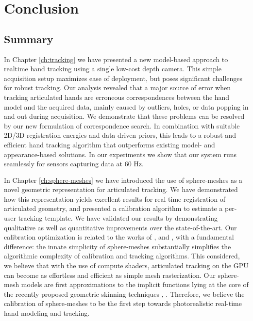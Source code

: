 \chapter{Conclusion}

\section{Summary}

In Chapter \ref{ch:tracking} we have presented a new model-based approach to realtime hand tracking using a single low-cost depth camera. This simple acquisition setup maximizes ease of deployment, but poses significant challenges for robust tracking. 
Our analysis revealed that a major source of error when tracking articulated hands are erroneous correspondences between the hand model and the acquired data, mainly caused by outliers, holes, or data popping in and out during acquisition. 
We demonstrate that these problems can be resolved by our new formulation of correspondence search. In combination with suitable 2D/3D registration energies and data-driven priors, this leads to a robust and efficient hand tracking algorithm that outperforms existing model- and appearance-based solutions. In our experiments we show that our system runs seamlessly for sensors capturing data at 60 Hz. 

In Chapter \ref{ch:sphere-meshes} we have introduced the use of sphere-meshes as a novel geometric representation for articulated tracking. We have demonstrated how this representation yields excellent results for real-time registration of articulated geometry, and presented a calibration algorithm to estimate a per-user tracking template. We have validated our results by demonstrating qualitative as well as quantitative improvements over the state-of-the-art. Our calibration optimization is related to the works of \cite{taylor2014user},  \cite{khamis15learning} and  \cite{joseph2016fits}, with a fundamental difference: the innate simplicity of sphere-meshes substantially simplifies the algorithmic complexity of calibration and tracking algorithms. This considered, we believe that with the use of compute shaders, articulated tracking on the GPU can become as effortless and efficient as simple mesh rasterization. 
Our sphere-mesh models are first approximations to the implicit functions lying at the core of the recently proposed geometric skinning techniques \cite{vaillant2013implicit},  \cite{vaillant2014robust}. Therefore, we believe the calibration of sphere-meshes to be the first step towards photorealistic real-time hand modeling and tracking.

